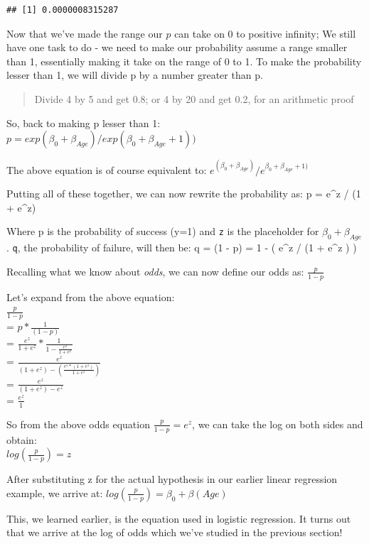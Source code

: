 \documentclass[
]{article}
\begin{document}
\begin{verbatim}
## [1] 0.0000008315287
\end{verbatim}

Now that we've made the range our \(p\) can take on 0 to positive
infinity; We still have one task to do - we need to make our probability
assume a range smaller than 1, essentially making it take on the range
of 0 to 1. To make the probability lesser than 1, we will divide p by a
number greater than p.~

\begin{quote}
Divide 4 by 5 and get 0.8; or 4 by 20 and get 0.2, for an arithmetic
proof
\end{quote}

So, back to making p lesser than 1:\\
\(p = exp(\beta_0 + \beta_{Age}) / exp(\beta_0 + \beta_{Age} + 1) )\)

The above equation is of course equivalent to:
\(e^{(\beta_0 + \beta_{Age})} / e^{\beta_0 + \beta_{Age}+ 1)}\)

Putting all of these together, we can now rewrite the probability as: p
= e\^{}z / (1 + e\^{}z)

Where p is the probability of success (y=1) and \texttt{z} is the
placeholder for \(\beta_0 + \beta_{Age}\). \texttt{q}, the probability
of failure, will then be: q = (1 - p) = 1 - ( e\^{}z / (1 + e\^{}z ) )

Recalling what we know about \emph{odds}, we can now define our odds as:
\(\frac{p}{1-p}\)

Let's expand from the above equation:\\
\(\frac{p}{1-p}\)\\
= \(p * \frac{1}{(1-p)}\)\\
= \(\frac{e^z}{1+e^z} * \frac{1}{1-\frac{e^z}{1+e^z}}\)\\
= \(\frac{e^z}{(1+e^z) - (\frac{e^z * (1+e^z)}{1+e^z})}\)\\
= \(\frac{e^z}{(1+e^z) - e^z}\)\\
= \(\frac{e^z}{1}\)

So from the above odds equation \(\frac{p}{1-p} = e^z\), we can take the
log on both sides and obtain:\\
\(log(\frac{p}{1-p}) = z\)

After substituting z for the actual hypothesis in our earlier linear
regression example, we arrive at:
\(log(\frac{p}{1-p}) = \beta_0 + \beta(Age)\)

This, we learned earlier, is the equation used in logistic regression.
It turns out that we arrive at the log of odds which we've studied in
the previous section!
\end{document}
